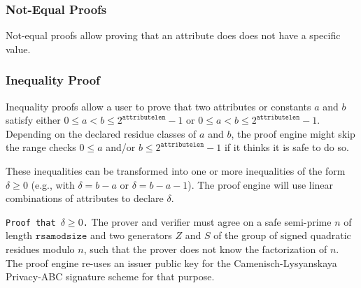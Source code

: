 \subsubsection{Not-Equal Proofs}

\notimplemented

Not-equal proofs allow proving that an attribute does does not have a specific value.

% 
% 
% 
        
\subsubsection{Inequality Proof}

Inequality proofs allow a user to prove that two attributes or constants $a$ and $b$
satisfy either $0\leq a < b \leq 2^{\texttt{attributelen}}-1$
or $0\leq a < b \leq 2^{\texttt{attributelen}}-1$.
Depending on the declared residue classes of $a$ and $b$, the proof engine might
skip the range checks $0\leq a$ and/or $b \leq 2^{\texttt{attributelen}}-1$ if
it thinks it is safe to do so.

These inequalities can be transformed into one or more inequalities of the form $\delta\geq 0$
(e.g., with $\delta = b-a$ or $\delta = b-a-1$). The proof engine will use linear combinations
of attributes to declare $\delta$.

\texttt{Proof that $\delta\geq 0$.}
The prover and verifier must agree on a safe semi-prime $n$ of length $\texttt{rsamodsize}$
and two generators $Z$ and $S$ of the group of signed quadratic residues modulo $n$,
such that the prover does not know the factorization of $n$. The proof engine re-uses
an issuer public key for the Camenisch-Lysyanskaya Privacy-ABC signature scheme for that purpose.

